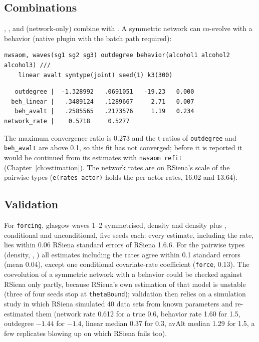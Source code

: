 \subsection{Combinations}

, ,  and  (network-only) combine with . A symmetric network can co-evolve with a behavior (native plugin with the batch path required):
\begin{lstlisting}
nwsaom, waves(sg1 sg2 sg3) outdegree behavior(alcohol1 alcohol2 alcohol3) ///
    linear avalt symtype(joint) seed(1) k3(300)
\end{lstlisting}
\begin{lstlisting}
   outdegree |  -1.328992   .0691051   -19.23   0.000
  beh_linear |   .3489124   .1289667     2.71   0.007
   beh_avalt |   .2585565   .2173576     1.19   0.234
network_rate |    0.5718     0.5277
\end{lstlisting}
The maximum convergence ratio is 0.273 and the t-ratios of \texttt{outdegree} and \texttt{beh\_avalt} are above 0.1, so this fit has not converged; before it is reported it would be continued from its estimates with \texttt{nwsaom refit} (Chapter~\ref{ch:estimation}). The network rates are on RSiena's scale of the pairwise types (\texttt{e(rates\_actor)} holds the per-actor rates, 16.02 and 13.64).

\subsection{Validation}

For \texttt{forcing}, glasgow waves 1--2 symmetrised, density and density plus , conditional and unconditional, five seeds each: every estimate, including the rate, lies within 0.06 RSiena standard errors of RSiena 1.6.6. For the pairwise types (density, , ) all estimates including the rates agree within 0.1 standard errors (mean 0.04), except one conditional covariate-rate coefficient (\texttt{force}, 0.13). The coevolution of a symmetric network with a behavior could be checked against RSiena only partly, because RSiena's own estimation of that model is unstable (three of four seeds stop at \texttt{thetaBound}); validation then relies on a simulation study in which RSiena simulated 40 data sets from known parameters and \nwsaom{} re-estimated them (network rate 0.612 for a true 0.6, behavior rate 1.60 for 1.5, outdegree $-1.44$ for $-1.4$, linear median 0.37 for 0.3, avAlt median 1.29 for 1.5, a few replicates blowing up on which RSiena fails too).

